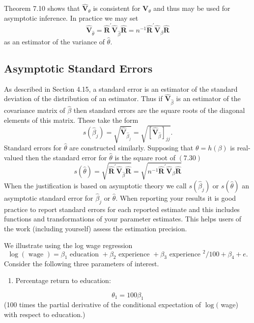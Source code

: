 \documentclass[10pt]{article}
\begin{document}
Theorem 7.10 shows that $\widehat{\boldsymbol{V}}_{\theta}$ is consistent for $\boldsymbol{V}_{\theta}$ and thus may be used for asymptotic inference. In practice we may set
$$
\widehat{\boldsymbol{V}}_{\widehat{\theta}}=\widehat{\boldsymbol{R}}^{\prime} \widehat{\boldsymbol{V}}_{\widehat{\beta}} \widehat{\boldsymbol{R}}=n^{-1} \widehat{\boldsymbol{R}}^{\prime} \widehat{\boldsymbol{V}}_{\beta} \widehat{\boldsymbol{R}}
$$
as an estimator of the variance of $\widehat{\theta}$.

\subsection{Asymptotic Standard Errors}
As described in Section 4.15, a standard error is an estimator of the standard deviation of the distribution of an estimator. Thus if $\widehat{\boldsymbol{V}}_{\widehat{\beta}}$ is an estimator of the covariance matrix of $\widehat{\beta}$ then standard errors are the square roots of the diagonal elements of this matrix. These take the form
$$
s\left(\widehat{\beta}_{j}\right)=\sqrt{\widehat{\boldsymbol{V}}_{\widehat{\beta}_{j}}}=\sqrt{\left[\widehat{\boldsymbol{V}}_{\widehat{\beta}}\right]_{j j}} .
$$
Standard errors for $\hat{\theta}$ are constructed similarly. Supposing that $\theta=h(\beta)$ is real-valued then the standard error for $\widehat{\theta}$ is the square root of $(7.30)$
$$
s(\widehat{\theta})=\sqrt{\widehat{\boldsymbol{R}}^{\prime} \widehat{\boldsymbol{V}}_{\widehat{\beta}} \widehat{\boldsymbol{R}}}=\sqrt{n^{-1} \widehat{\boldsymbol{R}}^{\prime} \widehat{\boldsymbol{V}}_{\beta} \widehat{\boldsymbol{R}}}
$$
When the justification is based on asymptotic theory we call $s\left(\widehat{\beta}_{j}\right)$ or $s(\widehat{\theta})$ an asymptotic standard error for $\widehat{\beta}_{j}$ or $\widehat{\theta}$. When reporting your results it is good practice to report standard errors for each reported estimate and this includes functions and transformations of your parameter estimates. This helps users of the work (including yourself) assess the estimation precision.

We illustrate using the log wage regression
$$
\log (\text { wage })=\beta_{1} \text { education }+\beta_{2} \text { experience }+\beta_{3} \text { experience }^{2} / 100+\beta_{4}+e .
$$
Consider the following three parameters of interest.

\begin{enumerate}
  \item Percentage return to education:
\end{enumerate}
$$
\theta_{1}=100 \beta_{1}
$$
(100 times the partial derivative of the conditional expectation of $\log ($ wage) with respect to education.)
\end{document}
